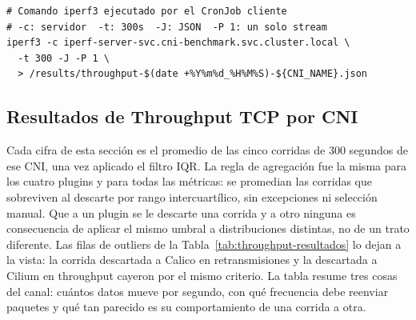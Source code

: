\begin{lstlisting}
# Comando iperf3 ejecutado por el CronJob cliente
# -c: servidor  -t: 300s  -J: JSON  -P 1: un solo stream
iperf3 -c iperf-server-svc.cni-benchmark.svc.cluster.local \
  -t 300 -J -P 1 \
  > /results/throughput-$(date +%Y%m%d_%H%M%S)-${CNI_NAME}.json
\end{lstlisting}

\subsection{Resultados de Throughput TCP por CNI}

Cada cifra de esta sección es el promedio de las cinco corridas de 300 segundos de ese CNI, una vez aplicado el filtro IQR. La regla de agregación fue la misma para los cuatro plugins y para todas las métricas: se promedian las corridas que sobreviven al descarte por rango intercuartílico, sin excepciones ni selección manual. Que a un plugin se le descarte una corrida y a otro ninguna es consecuencia de aplicar el mismo umbral a distribuciones distintas, no de un trato diferente. Las filas de outliers de la Tabla~\ref{tab:throughput-resultados} lo dejan a la vista: la corrida descartada a Calico en retransmisiones y la descartada a Cilium en throughput cayeron por el mismo criterio. La tabla resume tres cosas del canal: cuántos datos mueve por segundo, con qué frecuencia debe reenviar paquetes y qué tan parecido es su comportamiento de una corrida a otra.

